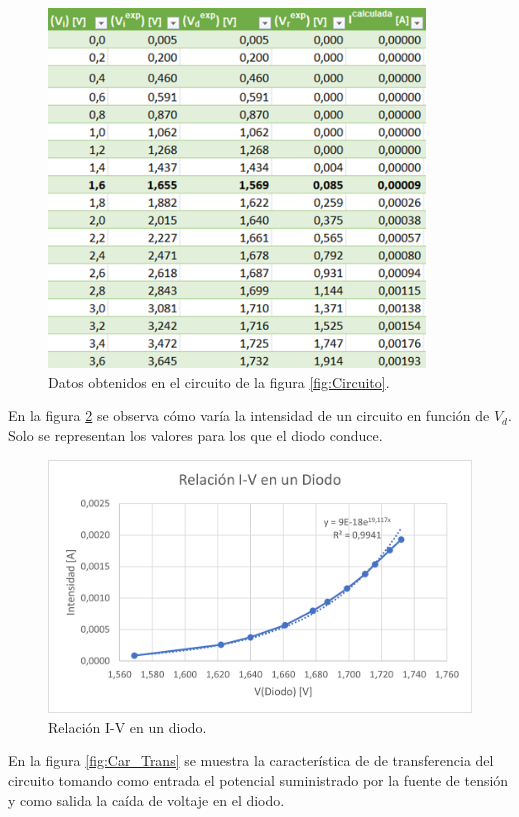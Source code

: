 \begin{figure}
    \centering
    \includegraphics[width=10cm]{Imágenes 04/Tabla_Datos_Exp.png}
    \caption{Datos obtenidos en el circuito de la figura \ref{fig:Circuito}.}
    \label{fig:Datos}
\end{figure}

En la figura \ref{fig:Rel_I-V} se observa cómo varía la intensidad de un circuito en función de $V_d$. Solo se representan los valores para los que el diodo conduce.

\begin{figure}
    \centering
    \includegraphics[width=13cm]{Imágenes 04/Rel_I-V.png}
    \caption{Relación I-V en un diodo.}
    \label{fig:Rel_I-V}
\end{figure}

En la figura \ref{fig:Car_Trans} se muestra la característica de de transferencia del circuito tomando como entrada el potencial suministrado por la fuente de tensión y como salida la caída de voltaje en el diodo.


